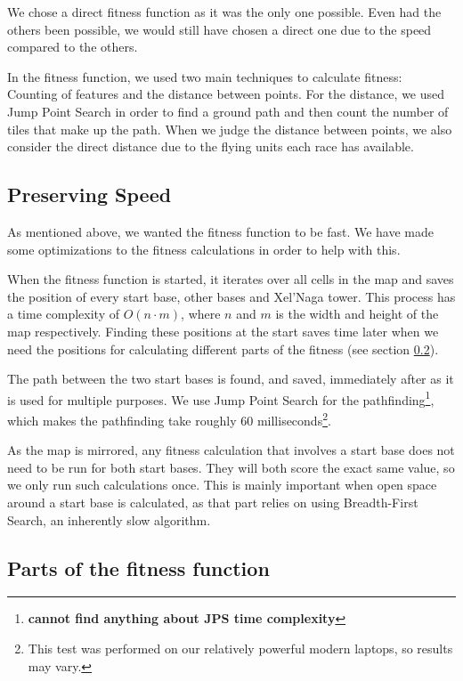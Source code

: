 We chose a direct fitness function as it was the only one possible. Even had the others been possible, we would still have chosen a direct one due to the speed compared to the others. 

In the fitness function, we used two main techniques to calculate fitness: Counting of features and the distance between points. For the distance, we used Jump Point Search\cite{harabor11a, harabor12, Podhraski2013jps} in order to find a ground path and then count the number of tiles that make up the path. When we judge the distance between points, we also consider the direct distance due to the flying units each race has available.

\subsection{Preserving Speed}
\label{methodology_mapfitness_speed}

As mentioned above, we wanted the fitness function to be fast. We have made some optimizations to the fitness calculations in order to help with this.

When the fitness function is started, it iterates over all cells in the map and saves the position of every start base, other bases and Xel'Naga tower. This process has a time complexity of $O(n\cdot m)$, where $n$ and $m$ is the width and height of the map respectively. Finding these positions at the start saves time later when we need the positions for calculating different parts of the fitness (see section \ref{methodology_mapfitness_parts}).

The path between the two start bases is found, and saved, immediately after as it is used for multiple purposes. We use Jump Point Search\cite{Podhraski2013jps} for the pathfinding\footnote{\textbf{cannot find anything about JPS time complexity}}, which makes the pathfinding take roughly 60 milliseconds\footnote{This test was performed on our relatively powerful modern laptops, so results may vary.}.

As the map is mirrored, any fitness calculation that involves a start base does not need to be run for both start bases. They will both score the exact same value, so we only run such calculations once. This is mainly important when open space around a start base is calculated, as that part relies on using Breadth-First Search, an inherently slow algorithm.

\subsection{Parts of the fitness function}
\label{methodology_mapfitness_parts}

